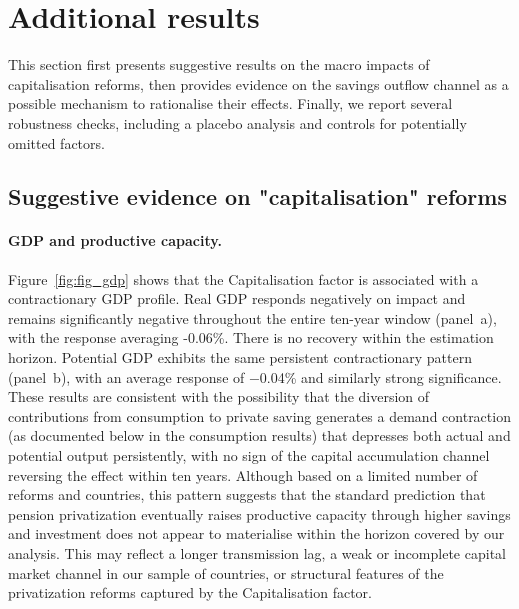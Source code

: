 \documentclass[11pt,english,a4paper, twoside, authoryear]{article}
\begin{document}



\section{Additional results}
\label{sec:more_results}

This section first presents suggestive results on the macro impacts of capitalisation reforms, then provides  evidence on the savings outflow channel as a possible mechanism to rationalise their effects. Finally, we report several robustness checks, including a placebo analysis and controls for potentially omitted factors.

\subsection{Suggestive evidence on "capitalisation" reforms}\label{sec:suggestive_capi}

\paragraph{GDP and productive capacity.} Figure~\ref{fig:fig_gdp} shows that the Capitalisation factor is associated with a contractionary GDP profile. Real GDP responds negatively on impact and remains significantly negative throughout the entire ten-year window (panel~a), with the response averaging -0.06\%. There is no recovery within the estimation horizon. Potential GDP exhibits the same persistent contractionary pattern (panel~b), with an average response of $-$0.04\% and similarly strong significance. These results are consistent with the possibility  that the diversion of contributions from consumption to private saving generates a demand contraction (as documented below in the consumption results) that depresses both actual and potential output persistently, with no sign of the capital accumulation channel reversing the effect within ten years. Although based on a limited number of reforms and countries, this pattern suggests that the standard prediction that pension privatization eventually raises productive capacity through higher savings and investment does not appear to materialise within the horizon covered by our analysis. This may reflect a longer transmission lag, a weak or incomplete capital market channel in our sample of countries, or structural features of the privatization reforms captured by the Capitalisation factor.\\
\end{document}
